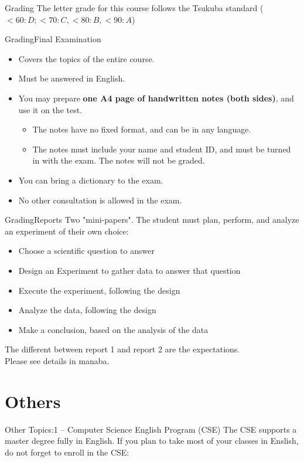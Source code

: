 \documentclass[aspectratio=169]{beamer}
\begin{document}
\begin{CJK}{UTF8}{ipxm}
\begin{frame}{Grading}
  The letter grade for this course follows the Tsukuba standard ($< 60: D; < 70: C, < 80: B, < 90: A$)
\end{frame}

\begin{frame}{Grading}{Final Examination}
  \begin{itemize}
    \item Covers the topics of the entire course.
    \item Must be answered in English.
    \item You may prepare {\bf one A4 page of handwritten notes (both sides)}, and use it on the test.
    \begin{itemize}
      \item The notes have no fixed format, and can be in any language.
      \item The notes must include your name and student ID, and must be turned in with the exam. The notes will not be graded.
    \end{itemize}
    \item You can bring a dictionary to the exam.
    \item No other consultation is allowed in the exam.
  \end{itemize}
\end{frame}

\begin{frame}{Grading}{Reports}
  Two "mini-papers". The student must plan, perform, and analyze an experiment of their own choice:\bigskip

  \begin{itemize}
    \item Choose a scientific question to answer
    \item Design an Experiment to gather data to answer that question
    \item Execute the experiment, following the design
    \item Analyze the data, following the design
    \item Make a conclusion, based on the analysis of the data
  \end{itemize}\bigskip

  The different between report 1 and report 2 are the expectations.\\ Please see details in manaba.
\end{frame}

\section{Others}
\begin{frame}{Other Topics:}{1 -- Computer Science English Program (CSE)}
  The CSE supports a master degree fully in English. If you plan to take most of your classes in Enslish, do not forget to enroll in the CSE:
  \bigskip


\end{frame}
\end{CJK}
\end{document}
